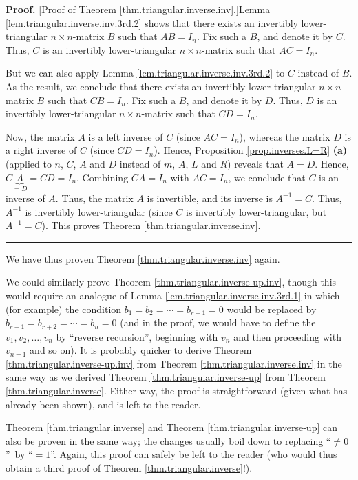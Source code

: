 \documentclass[numbers=enddot,12pt,final,onecolumn,notitlepage]{scrartcl}%
\theoremstyle{definition}
\newenvironment{proof}[1][Proof]{\noindent\textbf{#1.} }{\ \rule{0.5em}{0.5em}}
\begin{document}
\begin{proof}
[Proof of Theorem \ref{thm.triangular.inverse.inv}.]Lemma
\ref{lem.triangular.inverse.inv.3rd.2} shows that there exists an invertibly
lower-triangular $n\times n$-matrix $B$ such that $AB=I_{n}$. Fix such a $B$,
and denote it by $C$. Thus, $C$ is an invertibly lower-triangular $n\times
n$-matrix such that $AC=I_{n}$.

But we can also apply Lemma \ref{lem.triangular.inverse.inv.3rd.2} to $C$
instead of $B$. As the result, we conclude that there exists an invertibly
lower-triangular $n\times n$-matrix $B$ such that $CB=I_{n}$. Fix such a $B$,
and denote it by $D$. Thus, $D$ is an invertibly lower-triangular $n\times
n$-matrix such that $CD=I_{n}$.

Now, the matrix $A$ is a left inverse of $C$ (since $AC=I_{n}$), whereas the
matrix $D$ is a right inverse of $C$ (since $CD=I_{n}$). Hence, Proposition
\ref{prop.inverses.L=R} \textbf{(a)} (applied to $n$, $C$, $A$ and $D$ instead
of $m$, $A$, $L$ and $R$) reveals that $A=D$. Hence, $C\underbrace{A}%
_{=D}=CD=I_{n}$. Combining $CA=I_{n}$ with $AC=I_{n}$, we conclude that $C$ is
an inverse of $A$. Thus, the matrix $A$ is invertible, and its inverse is
$A^{-1}=C$. Thus, $A^{-1}$ is invertibly lower-triangular (since $C$ is
invertibly lower-triangular, but $A^{-1}=C$). This proves Theorem
\ref{thm.triangular.inverse.inv}.
\end{proof}

We have thus proven Theorem \ref{thm.triangular.inverse.inv} again.

We could similarly prove Theorem \ref{thm.triangular.inverse-up.inv}, though
this would require an analogue of Lemma \ref{lem.triangular.inverse.inv.3rd.1}
in which (for example) the condition $b_{1}=b_{2}=\cdots=b_{r-1}=0$ would be
replaced by $b_{r+1}=b_{r+2}=\cdots=b_{n}=0$ (and in the proof, we would have
to define the $v_{1},v_{2},\ldots,v_{n}$ by \textquotedblleft reverse
recursion\textquotedblright, beginning with $v_{n}$ and then proceeding with
$v_{n-1}$ and so on). It is probably quicker to derive Theorem
\ref{thm.triangular.inverse-up.inv} from Theorem
\ref{thm.triangular.inverse.inv} in the same way as we derived Theorem
\ref{thm.triangular.inverse-up} from Theorem \ref{thm.triangular.inverse}.
Either way, the proof is straightforward (given what has already been shown),
and is left to the reader.

Theorem \ref{thm.triangular.inverse} and Theorem
\ref{thm.triangular.inverse-up} can also be proven in the same way; the
changes usually boil down to replacing \textquotedblleft$\neq0$%
\textquotedblright\ by \textquotedblleft$=1$\textquotedblright. Again, this
proof can safely be left to the reader (who would thus obtain a third proof of
Theorem \ref{thm.triangular.inverse}!).
\end{document}
